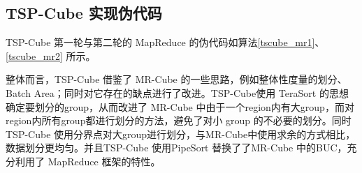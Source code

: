 
\subsection{TSP-Cube 实现伪代码}

TSP-Cube 第一轮与第二轮的 MapReduce 的伪代码如算法\ref{tscube_mr1}、\ref{tscube_mr2} 所示。

整体而言，TSP-Cube 借鉴了 MR-Cube 的一些思路，例如整体性度量的划分、Batch Area；同时对它存在的缺点进行了改进。TSP-Cube使用 TeraSort 的思想确定要划分的group，从而改进了 MR-Cube 中由于一个region内有大group，而对region内所有group都进行划分的方法，避免了对小 group 的不必要的划分。同时 TSP-Cube 使用分界点对大group进行划分，与MR-Cube中使用求余的方式相比，数据划分更均匀。并且TSP-Cube 使用PipeSort 替换了了MR-Cube 中的BUC，充分利用了 MapReduce 框架的特性。

